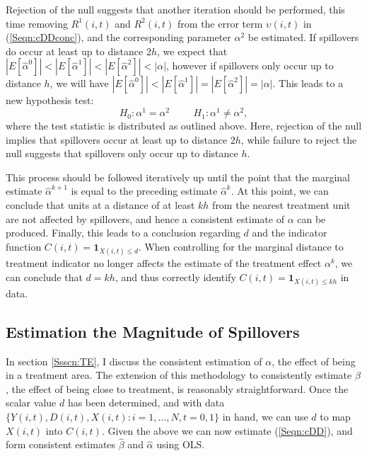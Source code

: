 Rejection of the null suggests that another iteration should be performed, this 
time removing $R^1(i,t)$ and $R^2(i,t)$ from the error term $\upsilon(i,t)$ in 
(\ref{Seqn:cDDconc}), and the corresponding parameter $\alpha^2$ be estimated.  
If spillovers do occur at least up to distance $2h$, we expect that 
$|E[\hat\alpha^0]|<|E[\hat\alpha^1]|<|E[\hat\alpha^2]|<|\alpha|$, however if 
spillovers only occur up to distance $h$, we will have 
$|E[\hat\alpha^0]|<|E[\hat\alpha^1]|=|E[\hat\alpha^2]|=|\alpha|$.  This leads 
to a new hypothesis test:
\[
H_0: \alpha^1=\alpha^2 \hspace{1cm}
H_1: \alpha^1\neq\alpha^2,
\]
where the test statistic is distributed as outlined above.  Here, rejection of 
the null implies that spillovers occur at least up to distance $2h$, while 
failure to reject the null suggests that spillovers only occur up to distance 
$h$.

This process should be followed iteratively up until the point that the marginal 
estimate $\hat\alpha^{k+1}$ is equal to the preceding estimate $\hat\alpha^{k}$.  
At this point, we can conclude that units at a distance of at least $kh$ from 
the nearest treatment unit are not affected by spillovers, and hence a 
consistent estimate of $\alpha$ can be produced. Finally, this leads to a 
conclusion regarding $d$ and the indicator function $C(i,t)=\mathbf{1}_{X(i,t)
\leq d}$.  When controlling for the marginal distance to treatment indicator no 
longer affects the estimate of the treatment effect $\alpha^k$, we can conclude 
that $d=kh$, and thus correctly identify $C(i,t)=\mathbf{1}_{X(i,t)\leq kh}$ in 
data.


\subsection{Estimation the Magnitude of Spillovers}
\label{Ssscn:SE}
In section \ref{Ssscn:TE}, I discuss the consistent estimation of $\alpha$, the
effect of being in a treatment area.  The extension of this methodology to 
consistently estimate $\beta$, the effect of being close to treatment, is 
reasonably straightforward.  Once the scalar value $d$ has been determined, and
with data $\{Y(i,t), D(i,t), X(i,t): i=1, \ldots, N, t=0, 1\}$ in hand, we can 
use $d$ to map $X(i,t)$ into $C(i,t)$. Given the above we can now estimate 
(\ref{Seqn:cDD}), and form consistent estimates $\hat\beta$ and $\hat\alpha$ 
using OLS.

